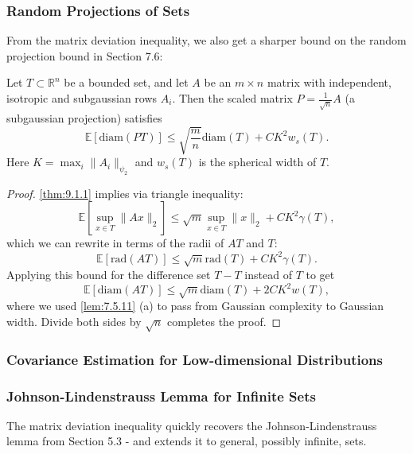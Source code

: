 \subsubsection{Random Projections of Sets}
From the matrix deviation inequality, we also get a sharper bound on the random projection bound in Section 7.6:

\begin{proposition}
\label{prop:9.2.1}
Let $T \subset \mathbb{R}^n$ be a bounded set, and let $A$ be an $m \times n$ matrix with independent, isotropic 
and subgaussian rows $A_i$. Then the scaled matrix $P = \frac{1}{\sqrt{n}}A$ (a subgaussian projection) satisfies
\[ \mathbb{E}\left[ \mathrm{diam}(PT) \right] \leq \sqrt{\frac{m}{n}}\mathrm{diam}(T) + CK^2 w_s(T). \]
Here $K = \max_{i}\lVert A_i \rVert_{\psi_2}$ and $w_s(T)$ is the spherical width of $T$.
\end{proposition}

\begin{proof}
\cref{thm:9.1.1} implies via triangle inequality:
\[ \mathbb{E}\left[ \sup_{x \in T}\lVert Ax \rVert_{2} \right] \leq \sqrt{m}\sup_{x \in T}\lVert x \rVert_{2} 
+ CK^2 \gamma(T), \]
which we can rewrite in terms of the radii of $AT$ and $T$:
\[ \mathbb{E}\left[ \mathrm{rad}(AT) \right] \leq \sqrt{m}\mathrm{rad}(T) + CK^2 \gamma(T). \]
Applying this bound for the difference set $T - T$ instead of $T$ to get 
\[ \mathbb{E}\left[ \mathrm{diam}(AT) \right] \leq \sqrt{m}\mathrm{diam}(T) + 2CK^2w(T), \]
where we used \cref{lem:7.5.11} (a) to pass from Gaussian complexity to Gaussian width. Divide both sides by 
$\sqrt{n}$ completes the proof.
\end{proof}


\subsubsection{Covariance Estimation for Low-dimensional Distributions}



\subsubsection{Johnson-Lindenstrauss Lemma for Infinite Sets}
The matrix deviation inequality quickly recovers the Johnson-Lindenstrauss lemma from Section 5.3 - and extends 
it to general, possibly infinite, sets.

